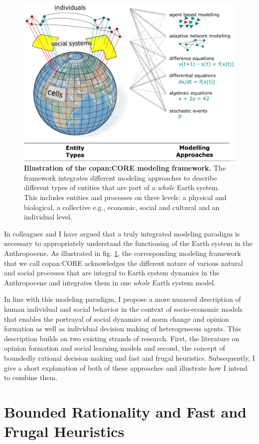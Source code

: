 \begin{figure}[t]
  \centering
  \includegraphics[width = .8 \textwidth]{figures/CORE.png}
  \caption{\textbf{Illustration of the copan:CORE modeling framework.} The framework integrates different modeling approaches to describe different types of entities that are part of a \emph{whole} Earth system. This includes entities and processes on three levels: a physical and biological, a collective e.g., economic, social and cultural and an individual level.}
  \label{fig:Core}
\end{figure}
In \citep{Donges2018} colleagues and I have argued that a truly integrated modeling paradigm is necessary to appropriately understand the functioning of the Earth system in the Anthropocene. As illustrated in fig. \ref{fig:Core}, the corresponding modeling framework that we call copan:CORE acknowledges the different nature of various natural and social processes that are integral to Earth system dynamics in the Anthropocene and integrates them in one \emph{whole} Earth system model.

In line with this modeling paradigm, I propose a more nuanced description of human individual and social behavior in the context of socio-economic models that enables the portrayal of social dynamics of norm change and opinion formation as well as individual decision making of heterogeneous agents. 
This description builds on two existing strands of research. First, the literature on opinion formation and social learning models and second, the concept of boundedly rational decision making and fast and frugal heuristics. Subsequently, I give a short explanation of both of these approaches and illustrate how I intend to combine them.

\section{Bounded Rationality and Fast and Frugal Heuristics}
\label{sec:intro_bounded_rationality} 

